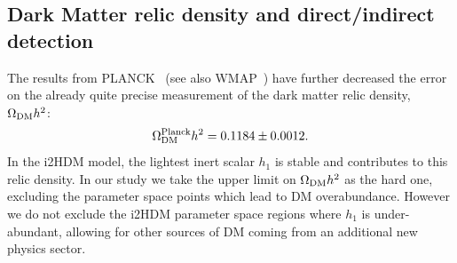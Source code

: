 \documentclass[12pt,a4paper]{article}
\newcommand {\blue} {\color{blue}}
\newcommand{\giac}[2]{{\blue #1 #2}}
\begin{document}
%
% 



%

\subsection{Dark Matter relic density and direct/indirect detection}

The results from PLANCK~\cite{Ade:2013zuv,Planck:2015xua} (see also WMAP~\cite{Hinshaw:2012aka}) have further decreased the error on the already quite precise measurement of the dark matter relic density, $\Omega_{\rm DM} h^2$:
\begin{equation}
\Omega_{\rm DM}^{\rm Planck} h^2=0.1184\pm0.0012.
\label{eq:planck-limit}
\end{equation} 
In the i2HDM model, the lightest inert scalar $h_1$ is stable and contributes to this relic density.
In our study we take the upper limit on  $\Omega_{\rm DM} h^2$ as the hard one,
excluding the parameter space points which lead to DM overabundance.
However we do not exclude the i2HDM parameter space regions where $h_1$ is under-abundant,
allowing for other sources of DM coming from an additional new physics sector.
\end{document}
